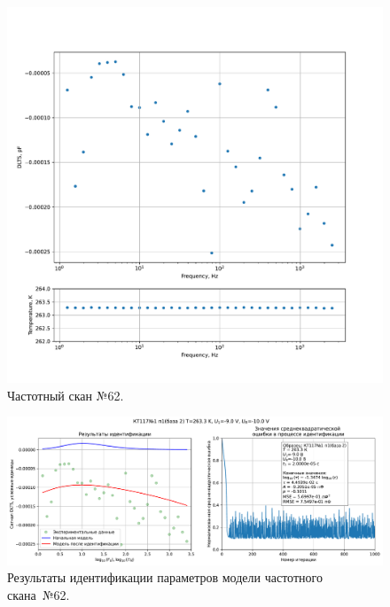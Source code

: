 \begin{figure}[!ht]
    \centering
    \includegraphics[width=1\textwidth]{../plots/КТ117№1_п1(база 2)_2500Гц-1Гц_1пФ_-10С_-9В-10В_10мВ_20мкс_шаг_0,1.pdf}
    \caption{Частотный скан №62.}
    \label{pic:frequency_scan_62}
\end{figure}

\begin{figure}[!ht]
    \centering
    \includegraphics[width=1\textwidth]{../plots/КТ117№1_п1(база 2)_2500Гц-1Гц_1пФ_-10С_-9В-10В_10мВ_20мкс_шаг_0,1_model.pdf}
    \caption{Результаты идентификации параметров модели частотного скана~№62.}
    \label{pic:frequency_scan_model62}
\end{figure}

\pagebreak


